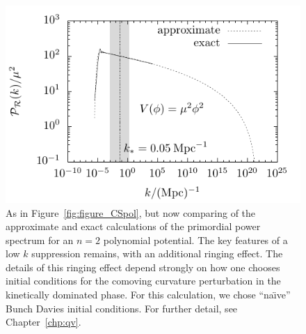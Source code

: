 \begin{figure}[tp]
  \centerline{\includegraphics[width=\textwidth]{chapters/kinetic_dominance/figures/new_CSpol}}
  \caption{As in Figure~\protect\ref{fig:figure_CSpol}, but now comparing of the approximate and exact calculations of the primordial power spectrum for an \(n=2\) polynomial potential. The key features of a low \(k\) suppression remains, with an additional ringing effect. The details of this ringing effect depend strongly on how one chooses initial conditions for the comoving curvature perturbation in the kinetically dominated phase. For this calculation, we chose ``na\"{\i}ve'' Bunch Davies initial conditions. For further detail, see Chapter~\protect\ref{chp:qv}.}\label{fig:new_CSpol}
\end{figure}


